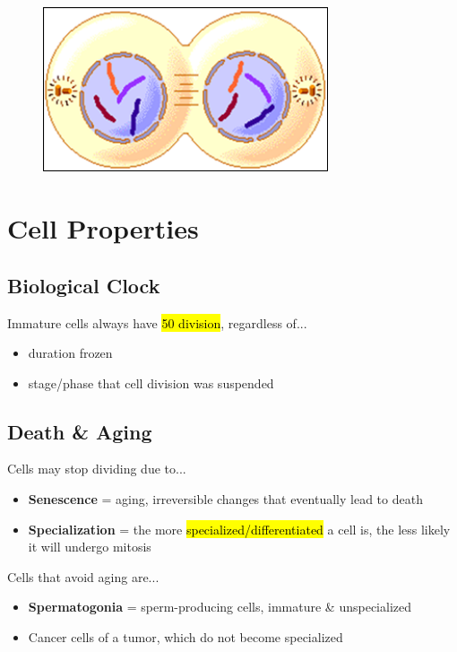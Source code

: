 \documentclass[a4paper,12pt]{article}
\begin{document}
\begin{figure}[H]
    \centering
    \includegraphics[width=0.75\textwidth]{telophase}
\end{figure}

\section{Cell Properties}

\subsection{Biological Clock}\noindent

Immature cells always have \hl{50 division}, regardless of...
\begin{itemize}
    \item{duration frozen}
    \item{stage/phase that cell division was suspended}
\end{itemize}

\subsection{Death \& Aging}\noindent

Cells may stop dividing due to...
\begin{itemize}
    \item{\textbf{Senescence} = aging, irreversible changes that eventually lead to death}
    \item{\textbf{Specialization} = the more \hl{specialized/differentiated} a cell is, the less likely it will undergo mitosis}
\end{itemize}

Cells that avoid aging are...
\begin{itemize}
    \item{\textbf{Spermatogonia} = sperm-producing cells, immature \& unspecialized}
    \item{Cancer cells of a tumor, which do not become specialized}
\end{itemize}
\end{document}
